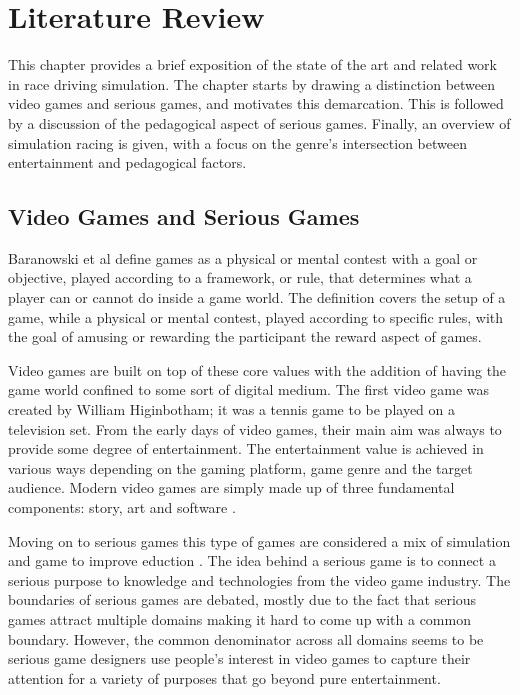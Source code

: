 \chapter{Literature Review}
\label{chp-LiteratureReview}

This chapter provides a brief exposition of the state of the art and related work in race driving simulation. The chapter starts by drawing a distinction between video games and serious games, and motivates this demarcation. This is followed by a discussion of the pedagogical aspect of serious games. Finally, an overview of simulation racing is given, with a focus on the genre's intersection between entertainment and pedagogical factors.

\section{Video Games and Serious Games}
Baranowski et al \cite{yuserious} define games as a physical or mental contest with a goal or objective, played according to a framework, or rule, that determines what a player can or cannot do inside a game world. The definition covers the setup of a game, while a physical or mental contest, played according to specific rules, with the goal of amusing or rewarding the participant the reward aspect of games.

Video games are built on top of these core values with the addition of having the game world confined to some sort of digital medium. The first video game was created by William Higinbotham; it was a tennis game to be played on a television set\cite{stanton2015brief}. From the early days of video games, their main aim was always to provide some degree of entertainment. The entertainment value is achieved in various ways depending on the gaming platform, game genre and the target audience. Modern video games are simply made up of three fundamental components: story, art and software \cite{zyda2005visual}.

Moving on to serious games this type of games are considered a mix of simulation and game to improve eduction \cite{abt1970}. The idea behind a serious game is to connect a serious purpose to knowledge and technologies from the video game industry\cite{michael2005serious}. The boundaries of serious games are debated, mostly due to the fact that serious games attract multiple domains making it hard to come up with a common boundary. However, the common denominator across all domains seems to be serious game designers use people's interest in video games to capture their attention for a variety of purposes that go beyond pure entertainment\cite{djaouti2011classifying}.

